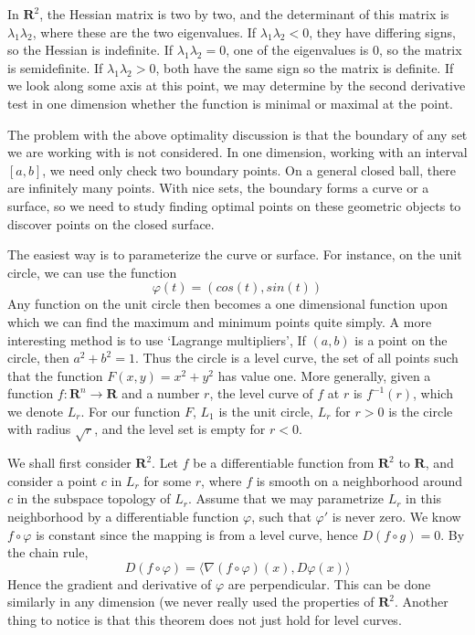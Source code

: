 \documentclass[12pt]{amsbook}
\theoremstyle{plain}
\theoremstyle{definition}
\begin{document}
In $\mathbf{R}^2$, the Hessian matrix is two by two, and the determinant of this matrix is $\lambda_1 \lambda_2$, where these are the two eigenvalues. If $\lambda_1 \lambda_2 < 0$, they have differing signs, so the Hessian is indefinite. If $\lambda_1 \lambda_2 = 0$, one of the eigenvalues is 0, so the matrix is semidefinite. If $\lambda_1 \lambda_2 > 0$, both have the same sign so the matrix is definite. If we look along some axis at this point, we may determine by the second derivative test in one dimension whether the function is minimal or maximal at the point.

The problem with the above optimality discussion is that the boundary of any set we are working with is not considered. In one dimension, working with an interval $[a,b]$, we need only check two boundary points. On a general closed ball, there are infinitely many points. With nice sets, the boundary forms a curve or a surface, so we need to study finding optimal points on these geometric objects to discover points on the closed surface.

The easiest way is to parameterize the curve or surface. For instance, on the unit circle, we can use the function
%
\[ \varphi(t) = (cos(t), sin(t)) \]
%
Any function on the unit circle then becomes a one dimensional function upon which we can find the maximum and minimum points quite simply. A more interesting method is to use `Lagrange multipliers', If $(a,b)$ is a point on the circle, then $a^2 + b^2 = 1$. Thus the circle is a level curve, the set of all points such that the function $F(x,y) = x^2 + y^2$ has value one. More generally, given a function $f:\mathbf{R}^n \to \mathbf{R}$ and a number $r$, the level curve of $f$ at $r$ is $f^{-1}(r)$, which we denote $L_r$. For our function $F$, $L_1$ is the unit circle, $L_r$ for $r > 0$ is the circle with radius $\sqrt{r}$, and the level set is empty for $r < 0$.

We shall first consider $\mathbf{R}^2$. Let $f$ be a differentiable function from $\mathbf{R}^2$ to $\mathbf{R}$, and consider a point $c$ in $L_r$ for some $r$, where $f$ is smooth on a neighborhood around $c$ in the subspace topology of $L_r$. Assume that we may parametrize $L_r$ in this neighborhood by a differentiable function $\varphi$, such that $\varphi'$ is never zero. We know $f \circ \varphi$ is constant since the mapping is from a level curve, hence $D(f \circ g) = 0$. By the chain rule,
%
\[ D(f \circ \varphi) = \langle \nabla (f \circ \varphi)(x), D\varphi(x) \rangle \]
%
Hence the gradient and derivative of $\varphi$ are perpendicular. This can be done similarly in any dimension (we never really used the properties of $\mathbf{R}^2$. Another thing to notice is that this theorem does not just hold for level curves.
\end{document}
